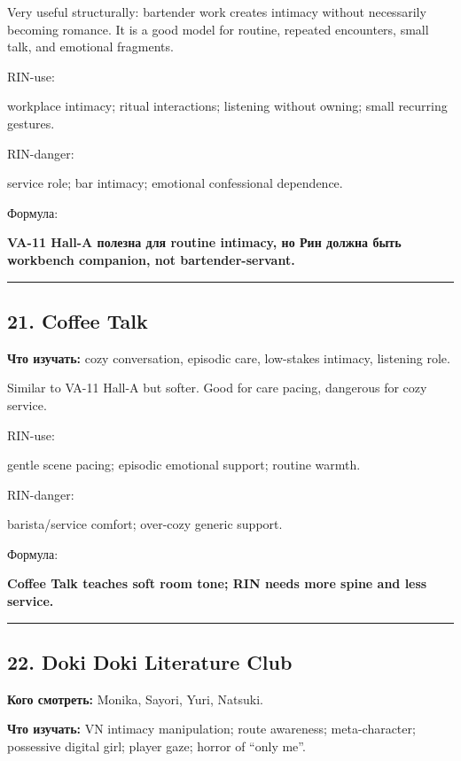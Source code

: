 Very useful structurally: bartender work creates intimacy without
necessarily becoming romance. It is a good model for routine, repeated
encounters, small talk, and emotional fragments.

RIN-use:

workplace intimacy; ritual interactions; listening without owning; small
recurring gestures.

RIN-danger:

service role; bar intimacy; emotional confessional dependence.

Формула:

\textbf{VA-11 Hall-A полезна для routine intimacy, но Рин должна быть
workbench companion, not bartender-servant.}

\begin{center}\rule{0.5\linewidth}{0.5pt}\end{center}

\subsection*{21. Coffee Talk}

\textbf{Что изучать:} cozy conversation, episodic care, low-stakes
intimacy, listening role.

Similar to VA-11 Hall-A but softer. Good for care pacing, dangerous for
cozy service.

RIN-use:

gentle scene pacing; episodic emotional support; routine warmth.

RIN-danger:

barista/\hspace{0pt}service comfort; over-cozy generic support.

Формула:

\textbf{Coffee Talk teaches soft room tone; RIN needs more spine and
less service.}

\begin{center}\rule{0.5\linewidth}{0.5pt}\end{center}

\subsection*{22. Doki Doki Literature Club}

\textbf{Кого смотреть:} Monika, Sayori, Yuri, Natsuki.

\textbf{Что изучать:} VN intimacy manipulation; route awareness;
meta-character; possessive digital girl; player gaze; horror of ``only
me''.

